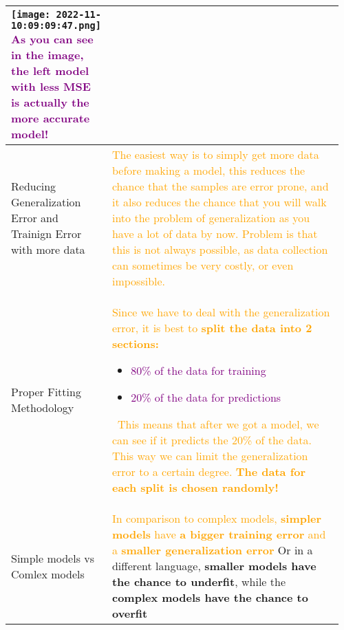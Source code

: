 \documentclass[main.tex,fontsize=8pt,paper=a4,paper=portrait,DIV=calc,]{scrartcl}
\begin{document}
\begin{table}[ht!]
\begin{tabular}{|m{0.2\linewidth}|m{0.755\linewidth}|}
\texttt{[image: 2022-11-10:09:09:47.png]}\newline
\textcolor{purple}{As you can see in the image, the left model with less MSE is actually the more accurate model!}\\
\hline
Reducing Generalization Error and Trainign Error with more data & 
\textcolor{orange}{The easiest way is to simply get more data before making a model, this reduces the chance that the samples are error prone, and it also reduces the chance that you will walk into the problem of generalization as you have a lot of data by now.\newline
Problem is that this is not always possible, as data collection can sometimes be very costly, or even impossible.}\\
\hline
Proper Fitting Methodology & 
\textcolor{orange}{Since we have to deal with the generalization error, it is best to \textbf{split the data into 2 sections:}}\newline
\begin{itemize}
\item \textcolor{purple}{80\% of the data for training}
\item \textcolor{purple}{20\% of the data for predictions}
\end{itemize} 
\, \newline
\textcolor{orange}{This means that after we got a model, we can see if it predicts the 20\% of the data. \newline
This way we can limit the generalization error to a certain degree.\newline
\textbf{The data for each split is chosen randomly!}}\\
\hline
Simple models vs Comlex models &
\textcolor{orange}{In comparison to complex models, \textbf{simpler models} have \textbf{a bigger training error} and a \textbf{smaller generalization error}}\newline
Or in a different language, \textbf{smaller models have the chance to underfit}, while the \textbf{complex models have the chance to overfit}\\
\hline
\end{tabular}
\end{table}
\pagebreak
\end{document}
